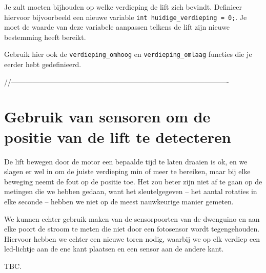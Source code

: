 \documentclass[a4paper, 10pt]{article}
\begin{document}
Je zult moeten bijhouden op welke verdieping de lift zich bevindt. Definieer hiervoor bijvoorbeeld een 
nieuwe variable \texttt{int huidige\_verdieping = 0;}. Je moet de waarde van deze variabele aanpassen telkens
de lift zijn nieuwe bestemming heeft bereikt.

Gebruik hier ook de \texttt{verdieping\_omhoog} en \texttt{verdieping\_omlaag} functies die je
eerder hebt gedefinieerd.


//-------------------------------------------------------------------------------------------
\section{Gebruik van sensoren om de positie van de lift te detecteren}

De lift bewegen door de motor een bepaalde tijd te laten draaien is ok, en we slagen er wel in om de juiste verdieping min of meer te bereiken,
maar bij elke beweging neemt de fout op de positie toe. Het zou beter zijn niet af te gaan op de metingen die we hebben gedaan, want het
sleutelgegeven -- het aantal rotaties in elke seconde -- hebben we niet op de meest nauwkeurige manier gemeten.

We kunnen echter gebruik maken van de sensorpoorten van de dwenguino en aan elke poort de stroom te meten die niet door een 
fotosensor wordt tegengehouden. Hiervoor hebben we echter een nieuwe toren nodig, waarbij we op elk verdiep een led-lichtje aan de
ene kant plaatsen en een sensor aan de andere kant. 

TBC.
\end{document}
